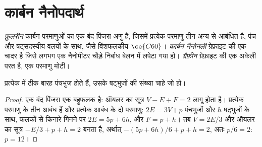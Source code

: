 \section{कार्बन नैनोपदार्थ}

\begin{definition}[कार्बन नैनोपदार्थ]\label{def:b3:inorganic-materials:carbon}
\emph{फ़ुलरीन} कार्बन परमाणुओं का एक बंद पिंजरा अणु है,
जिसमें प्रत्येक परमाणु तीन अन्य से आबंधित है, पंच- और षट्सदस्यीय वलयों के साथ, जैसे
विंशफलकीय $\ce{C60}$। \emph{कार्बन नैनोनली} ग्रेफ़ाइट की एक
चादर है जिसे लगभग एक नैनोमीटर चौड़े निर्बाध बेलन में लपेटा गया हो।
\emph{ग्रैफ़ीन} ग्रेफ़ाइट की एक अकेली परत है, एक परमाणु मोटी।
\end{definition}

\begin{proposition}[बारह पंचभुज]\label{prop:b3:inorganic-materials:euler}
प्रत्येक  में ठीक बारह पंचभुज होते हैं, उसके षट्भुजों की संख्या
चाहे जो हो।
\end{proposition}

\begin{proof}
एक बंद पिंजरा एक बहुफलक है: ऑयलर का सूत्र $V - E + F = 2$ लागू होता है। प्रत्येक परमाणु के
तीन आबंध हैं और प्रत्येक आबंध के दो परमाणु: $2E = 3V$। $p$ पंचभुजों और $h$ षट्भुजों के साथ,
फलकों से किनारे गिनने पर $2E = 5p + 6h$, और $F = p + h$। तब $V = 2E/3$ और ऑयलर का
सूत्र $-E/3 + p + h = 2$ बनता है, अर्थात् $-(5p + 6h)/6 + p + h = 2$, अतः $p/6 = 2$: $p = 12$।
\end{proof}

